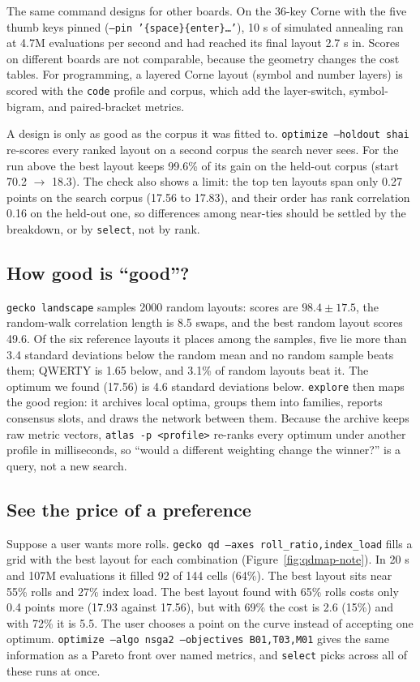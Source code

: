 \documentclass{gecko-paper}
\begin{document}
\begin{paperbody}
The same command designs for other boards. On the 36-key Corne with the five thumb keys pinned (\texttt{--pin '\{space\}\{enter\}\dots'}), 10 s of simulated annealing ran at 4.7M evaluations per second and had reached its final layout 2.7 s in. Scores on different boards are not comparable, because the geometry changes the cost tables. For programming, a layered Corne layout (symbol and number layers) is scored with the \texttt{code} profile and corpus, which add the layer-switch, symbol-bigram, and paired-bracket metrics.

A design is only as good as the corpus it was fitted to. \texttt{optimize --holdout shai} re-scores every ranked layout on a second corpus the search never sees. For the run above the best layout keeps 99.6\% of its gain on the held-out corpus (start 70.2 $\to$ 18.3). The check also shows a limit: the top ten layouts span only 0.27 points on the search corpus (17.56 to 17.83), and their order has rank correlation 0.16 on the held-out one, so differences among near-ties should be settled by the breakdown, or by \texttt{select}, not by rank.

\subsection{How good is ``good''?}
\texttt{gecko landscape} samples 2000 random layouts: scores are $98.4\pm17.5$, the random-walk correlation length is 8.5 swaps, and the best random layout scores 49.6. Of the six reference layouts it places among the samples, five lie more than 3.4 standard deviations below the random mean and no random sample beats them; QWERTY is 1.65 below, and 3.1\% of random layouts beat it. The optimum we found (17.56) is 4.6 standard deviations below. \texttt{explore} then maps the good region: it archives local optima, groups them into families, reports consensus slots, and draws the network between them. Because the archive keeps raw metric vectors, \texttt{atlas -p <profile>} re-ranks every optimum under another profile in milliseconds, so ``would a different weighting change the winner?'' is a query, not a new search.

\subsection{See the price of a preference}
Suppose a user wants more rolls. \texttt{gecko qd --axes roll\_ratio,index\_load} fills a grid with the best layout for each combination (Figure~\ref{fig:qdmap-note}). In 20 s and 107M evaluations it filled 92 of 144 cells (64\%). The best layout sits near 55\% rolls and 27\% index load. The best layout found with 65\% rolls costs only 0.4 points more (17.93 against 17.56), but with 69\% the cost is 2.6 (15\%) and with 72\% it is 5.5. The user chooses a point on the curve instead of accepting one optimum. \texttt{optimize --algo nsga2 --objectives B01,T03,M01} gives the same information as a Pareto front over named metrics, and \texttt{select} picks across all of these runs at once.


\end{paperbody}
\end{document}
